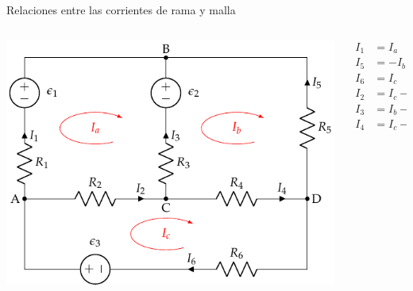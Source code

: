 \documentclass[aspectratio=169, xcolor={usenames,svgnames,dvipsnames}]{beamer}
\begin{document}
\begin{frame}{Relaciones entre las corrientes de rama y malla}
    \begin{columns}
    \begin{column}{0.6\columnwidth}
    \begin{center}
    \includegraphics[width=.9\linewidth]{../figs/mallas1_corrientes.pdf}
    \end{center}
    \end{column}
    \begin{column}{0.4\columnwidth}
    
    \begin{align*}
      I_1 &= I_a\\
      I_5 &= -I_b\\
      I_6 &= I_c\\
      I_2 &= I_c -I_a\\
      I_3 &= I_b - I_a\\
      I_4 &= I_c - I_b
    \end{align*}
    \end{column}
    \end{columns}
\end{frame}

\end{document}
